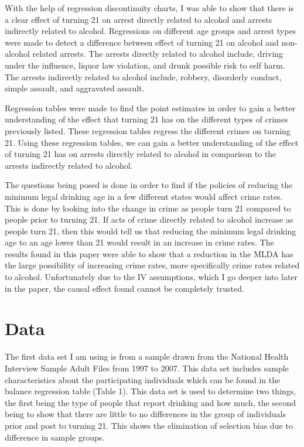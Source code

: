 \documentclass[a4paper]{article}
\begin{document}
With the help of regression discontinuity charts, I was able to show that there is a clear effect of turning 21 on arrest directly related to alcohol and arrests indirectly related to alcohol. Regressions on different age groups and arrest types were made to detect a difference between effect of turning 21 on alcohol and non-alcohol related arrests. The arrests directly related to alcohol include, driving under the influence, liquor law violation, and drunk possible risk to self harm. The arrests indirectly related to alcohol include, robbery, disorderly conduct, simple assault, and aggravated assault. 
\par
Regression tables were made to find the point estimates in order to gain a better understanding of the effect that turning 21 has on the different types of crimes previously listed. These regression tables regress the different crimes on turning 21. Using these regression tables, we can gain a better understanding of the effect of turning 21 has on arrests directly related to alcohol in comparison to the arrests indirectly related to alcohol. 
\par
The questions being posed is done in order to find if the policies of reducing the minimum legal drinking age in a few different states would affect crime rates. This is done by looking into the change in crime as people turn 21 compared to people prior to turning 21. If acts of crime directly related to alcohol increase as people turn 21, then this would tell us that reducing the minimum legal drinking age to an age lower than 21 would result in an increase in crime rates. The results found in this paper were able to show that a reduction in the MLDA has the large possibility of increasing crime rates, more specifically crime rates related to alcohol. Unfortunately due to the IV assumptions, which I go deeper into later in the paper, the causal effect found cannot be completely trusted. 

\section{Data}
The first data set I am using is from a sample drawn from the National Health Interview Sample Adult Files from 1997 to 2007. This data set includes sample characteristics about the participating individuals which can be found in the balance regression table (Table 1). This data set is used to determine two things, the first being the type of people that report drinking and how much, the second being to show that there are little to no differences in the group of individuals prior and post to turning 21. This shows the elimination of selection bias due to difference in sample groups. 
\end{document}
